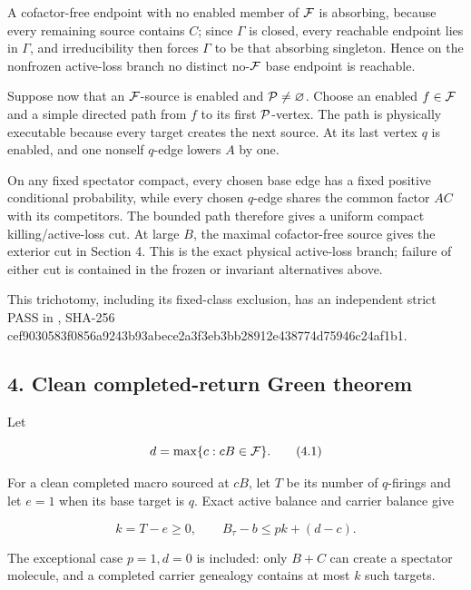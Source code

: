 A cofactor-free endpoint with no enabled member of \({\cal F}\) is
absorbing, because every remaining source contains \(C\); since
\(\Gamma\) is closed, every reachable endpoint lies in \(\Gamma\), and
irreducibility then forces \(\Gamma\) to be that absorbing singleton.
Hence on the nonfrozen active-loss branch no distinct no-\({\cal F}\)
base endpoint is reachable.

Suppose now that an \({\cal F}\)-source is enabled and
\({\cal P}\ne\varnothing\). Choose an enabled \(f\in{\cal F}\) and a
simple directed path from \(f\) to its first \({\cal P}\)-vertex. The
path is physically executable because every target creates the next
source. At its last vertex \(q\) is enabled, and one nonself \(q\)-edge
lowers \(A\) by one.

On any fixed spectator compact, every chosen base edge has a fixed
positive conditional probability, while every chosen \(q\)-edge shares
the common factor \(AC\) with its competitors. The bounded path
therefore gives a uniform compact killing/active-loss cut. At large
\(B\), the maximal cofactor-free source gives the exterior cut in
Section 4. This is the exact physical active-loss branch; failure of
either cut is contained in the frozen or invariant alternatives above.

This trichotomy, including its fixed-class exclusion, has an independent
strict PASS in
\texttt{},
SHA-256
cef9030583f0856a9243b93abece2a3f3eb3bb28912e438774d75946c24af1b1.

\subsection{4. Clean completed-return Green
theorem}

Let

\[
 d=\max\{c:cB\in{\cal F}\}.                                \tag{4.1}
\]

For a clean completed macro sourced at \(cB\), let \(T\) be its number
of \(q\)-firings and let \(e=1\) when its base target is \(q\). Exact
active balance and carrier balance give

\[
                k=T-e\ge0,\qquad
                B_\tau-b\le pk+(d-c).                      \tag{4.2}
\]

The exceptional case \(p=1,d=0\) is included: only \(B+C\) can create a
spectator molecule, and a completed carrier genealogy contains at most
\(k\) such targets.


